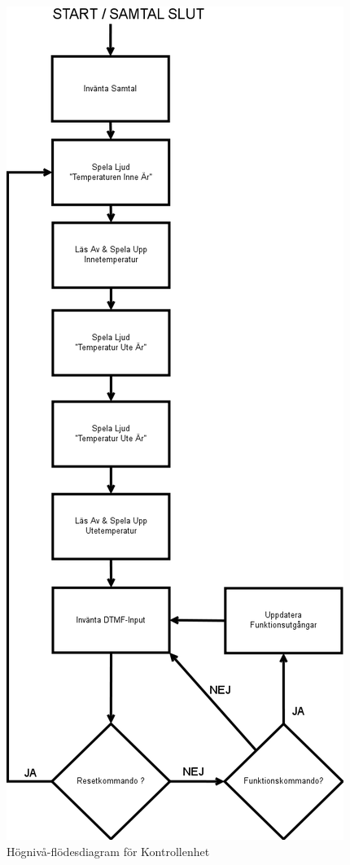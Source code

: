 \documentclass[a4paper,11pt]{article}
\begin{document}
		\begin{figure}[H]
		  \centering
		      \includegraphics[scale=0.35, angle=0]{ControlUnitFlowChart.png}
		  	\caption{Högnivå-flödesdiagram för Kontrollenhet}
			\label{fig:CUFlowChart}
		\end{figure}
\end{document}
